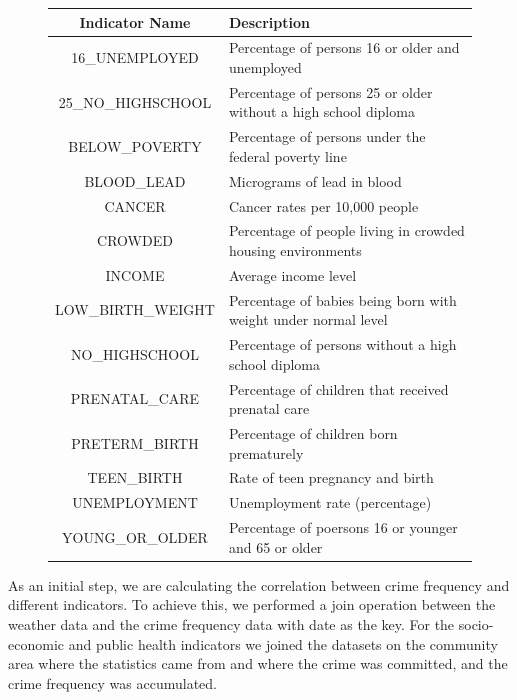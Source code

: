 \documentclass[a4paper,10pt]{article}
\begin{document}
\begin{figure}
	\begin{tabular}{|c|l|}
	\hline 
	\textbf{Indicator Name} & \textbf{Description} \\ 
	\hline 
	16\_UNEMPLOYED & Percentage of persons 16 or older and unemployed \\\hline
25\_NO\_HIGHSCHOOL & Percentage of persons 25 or older without a high school diploma \\\hline
BELOW\_POVERTY & Percentage of persons under the federal poverty line\\\hline
BLOOD\_LEAD & Micrograms of lead in blood\\\hline
CANCER & Cancer rates per 10,000 people\\\hline
CROWDED & Percentage of people living in crowded housing environments\\\hline
INCOME & Average income level\\\hline
LOW\_BIRTH\_WEIGHT & Percentage of babies being born with weight under normal level\\\hline
NO\_HIGHSCHOOL & Percentage of persons without a high school diploma\\\hline
PRENATAL\_CARE & Percentage of children that received prenatal care\\\hline
PRETERM\_BIRTH & Percentage of children born prematurely\\\hline
TEEN\_BIRTH & Rate of teen pregnancy and birth\\\hline
UNEMPLOYMENT & Unemployment rate (percentage)\\\hline
YOUNG\_OR\_OLDER & Percentage of poersons 16 or younger and 65 or older \\
\hline
	\end{tabular} 
\end{figure}

As an initial step, we are calculating the correlation between crime frequency and different indicators. To achieve this, we performed a join operation between the weather data and the crime frequency data with date as the key. For the socio-economic and public health indicators we joined the datasets on the community area where the statistics came from and where the crime was committed, and the crime frequency was accumulated.\\
\end{document}
